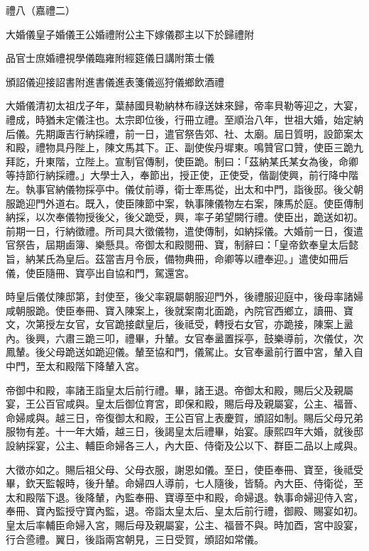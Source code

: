 
\begin{pinyinscope}
禮八（嘉禮二）

大婚儀皇子婚儀王公婚禮附公主下嫁儀郡主以下於歸禮附

品官士庶婚禮視學儀臨雍附經筵儀日講附策士儀

頒詔儀迎接詔書附進書儀進表箋儀巡狩儀鄉飲酒禮

大婚儀清初太祖戊子年，葉赫國貝勒納林布祿送妹來歸，帝率貝勒等迎之，大宴，禮成，時猶未定儀注也。太宗即位後，行冊立禮。至順治八年，世祖大婚，始定納后儀。先期諏吉行納採禮，前一日，遣官祭告郊、社、太廟。屆日質明，設節案太和殿，禮物具丹陛上，陳文馬其下。正、副使俟丹墀東。鳴贊官口贊，使臣三跪九拜訖，升東階，立陛上。宣制官傳制，使臣跪。制曰：「茲納某氏某女為後，命卿等持節行納採禮。」大學士入，奉節出，授正使，正使受，偕副使興，前行降中階左。執事官納儀物採亭中。儀仗前導，衛士牽馬從，出太和中門，詣後邸。後父朝服跪迎門外道右。既入，使臣陳節中案，執事陳儀物左右案，陳馬於庭。使臣傳制納採，以次奉儀物授後父，後父跪受，興，率子弟望闕行禮。使臣出，跪送如初。前期一日，行納徵禮。所司具大徵儀物，遣使傳制，如納採儀。大婚前一日，復遣官祭告，屆期鹵簿、樂懸具。帝御太和殿閱冊、寶，制辭曰：「皇帝欽奉皇太后懿旨，納某氏為皇后。茲當吉月令辰，備物典冊，命卿等以禮奉迎。」遣使如冊后儀，使臣隨冊、寶亭出自協和門，駕還宮。

時皇后儀仗陳邸第，封使至，後父率親屬朝服迎門外，後禮服迎庭中，後母率諸婦咸朝服跪。使臣奉冊、寶入陳案上，後就案南北面跪，內院官西鄉立，讀冊、寶文，次第授左女官，女官跪接獻皇后，後祗受，轉授右女官，亦跪接，陳案上盝內。後興，六肅三跪三叩，禮畢，升輦。女官奉盝置採亭，鼓樂導前，次儀仗，次鳳輦。後父母跪送如跪迎儀。輦至協和門，儀駕止。女官奉盝前行置中宮，輦入自中門，至太和殿階下降輦入宮。

帝御中和殿，率諸王詣皇太后前行禮。畢，諸王退。帝御太和殿，賜后父及親屬宴，王公百官咸與。皇太后御位育宮，即保和殿，賜后母及親屬宴，公主、福晉、命婦咸與。越三日，帝復御太和殿，王公百官上表慶賀，頒詔如制。賜后父母兄弟服物有差。十一年大婚，越三日，後謁皇太后禮畢，始宴。康熙四年大婚，就後邸設納採宴，公主、輔臣命婦各三人，內大臣、侍衛及公以下、群臣二品以上咸與。

大徵亦如之。賜后祖父母、父母衣服，謝恩如儀。至日，使臣奉冊、寶至，後祗受畢，欽天監報時，後升輦。命婦四人導前，七人隨後，皆騎。內大臣、侍衛從，至太和殿階下退。後降輦，內監奉冊、寶導至中和殿，命婦退。執事命婦迎侍入宮，奉冊、寶內監授守寶內監，退。帝詣太皇太后、皇太后前行禮，御殿、賜宴如初。皇太后率輔臣命婦入宮，賜后母及親屬宴，公主、福晉不與。時加酉，宮中設宴，行合巹禮。翼日，後詣兩宮朝見，三日受賀，頒詔如常儀。


\end{pinyinscope}
